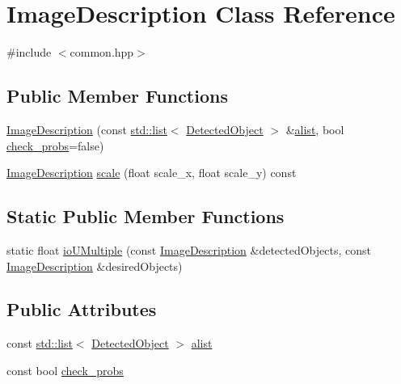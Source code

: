 \hypertarget{classImageDescription}{}\section{Image\+Description Class Reference}
\label{classImageDescription}


{\ttfamily \#include $<$common.\+hpp$>$}

\subsection*{Public Member Functions}
\begin{DoxyCompactItemize}
\item 
\hyperlink{classImageDescription_a5306d6db34b16ff3ca9742e9036b025f}{Image\+Description} (const \hyperlink{CMakeLists_8txt_a548e427ae9357a6f3536cff3ca23efda}{std\+::list}$<$ \hyperlink{classDetectedObject}{Detected\+Object} $>$ \&\hyperlink{classImageDescription_aa814580e2dd58fc3442ddd3549e6d81d}{alist}, bool \hyperlink{classImageDescription_a4df135809acd954ad6882c2b805b2a5b}{check\+\_\+probs}=false)
\item 
\hyperlink{classImageDescription}{Image\+Description} \hyperlink{classImageDescription_a1b6675d07182ddf75a704b091daaa8ff}{scale} (float scale\+\_\+x, float scale\+\_\+y) const 
\end{DoxyCompactItemize}
\subsection*{Static Public Member Functions}
\begin{DoxyCompactItemize}
\item 
static float \hyperlink{classImageDescription_a2068c70b38a7c66811c7ca3acf1a6f80}{io\+U\+Multiple} (const \hyperlink{classImageDescription}{Image\+Description} \&detected\+Objects, const \hyperlink{classImageDescription}{Image\+Description} \&desired\+Objects)
\end{DoxyCompactItemize}
\subsection*{Public Attributes}
\begin{DoxyCompactItemize}
\item 
const \hyperlink{CMakeLists_8txt_a548e427ae9357a6f3536cff3ca23efda}{std\+::list}$<$ \hyperlink{classDetectedObject}{Detected\+Object} $>$ \hyperlink{classImageDescription_aa814580e2dd58fc3442ddd3549e6d81d}{alist}
\item 
const bool \hyperlink{classImageDescription_a4df135809acd954ad6882c2b805b2a5b}{check\+\_\+probs}
\end{DoxyCompactItemize}


